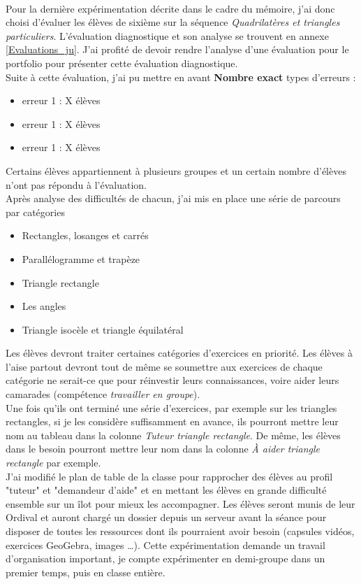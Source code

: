 \paragraph{} Pour la dernière expérimentation décrite dans le cadre du mémoire, j'ai donc choisi d'évaluer les élèves de sixième sur la séquence \textit{Quadrilatères et triangles particuliers}. L'évaluation diagnostique et son analyse se trouvent en annexe \ref{Evaluations_ju}. J'ai profité de devoir rendre l'analyse d'une évaluation pour le portfolio pour présenter cette évaluation diagnostique.\\
Suite à cette évaluation, j'ai pu mettre en avant \textbf{Nombre exact} types d'erreurs :
\begin{itemize}
	\item erreur 1 : X élèves
	\item erreur 1 : X élèves
	\item erreur 1 : X élèves
\end{itemize}
Certains élèves appartiennent à plusieurs groupes et un certain nombre d'élèves n'ont pas répondu à l'évaluation.\\
Après analyse des difficultés de chacun, j'ai mis en place une série de parcours par catégories %
\begin{itemize}
\item Rectangles, losanges et carrés
\item Parallélogramme et trapèze
\item Triangle rectangle
\item Les angles
\item Triangle isocèle et triangle équilatéral
\end{itemize}
Les élèves devront traiter certaines catégories d'exercices en priorité.
Les élèves à l'aise partout devront tout de même se soumettre aux exercices de chaque catégorie ne serait-ce que pour réinvestir leurs connaissances, voire aider leurs camarades (compétence \textit{travailler en groupe}).\\
Une fois qu'ils ont terminé une série d'exercices, par exemple sur les triangles rectangles, si je les considère suffisamment en avance, ils pourront mettre leur nom au tableau dans la colonne \textit{Tuteur triangle rectangle}. De même, les élèves dans le besoin pourront mettre leur nom dans la colonne \textit{À aider triangle rectangle} par exemple.\\
J'ai modifié le plan de table de la classe pour rapprocher des élèves au profil "tuteur" et "demandeur d'aide" et en mettant les élèves en grande difficulté ensemble sur un îlot pour mieux les accompagner.
Les élèves seront munis de leur Ordival et auront chargé un dossier depuis un serveur avant la séance pour disposer de toutes les ressources dont ils pourraient avoir besoin (capsules vidéos, exercices GeoGebra, images \ldots).
Cette expérimentation demande un travail d'organisation important, je compte expérimenter en demi-groupe dans un premier temps, puis en classe entière.
